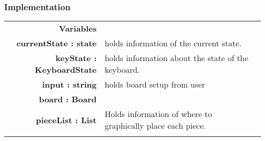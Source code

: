\documentclass[10pt]{article}
\begin{document}
    \subsubsection{Implementation}
        \begin{tabularx}{\linewidth}{ >{\bfseries}r Xp{5cm} }
            Variables       & \begin{tabular}[t]{@{} l p{8cm}} 
                                     & \\
                                    currentState : state & holds information of the current state. \\
			    keyState : KeyboardState & holds information about the state of the keyboard. \\
                                    input : string & holds board setup from user \\ 
                                    board : Board & \\
                                    pieceList : List &  Holds information of where to graphically place each piece. \\
                              \end{tabular} \\


\end{tabularx}
\end{document}
